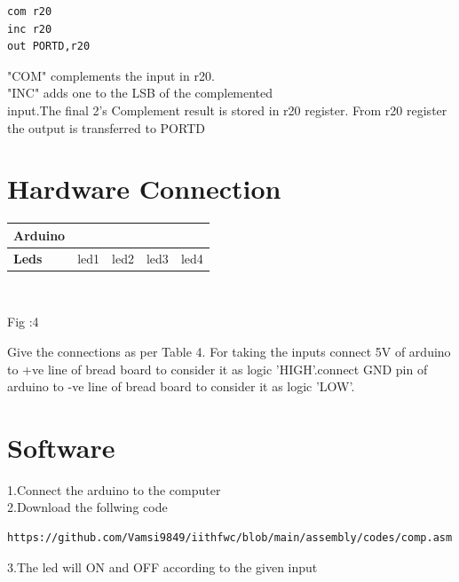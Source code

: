 \documentclass[10pt, a4paper]{article}
\begin{document}
 \begin{lstlisting}
com r20
inc r20
out PORTD,r20
 \end{lstlisting}
"COM" complements the input in r20.\\
"INC" adds one to the LSB of the complemented\\  
    input.The final 2's Complement result is stored in r20 register. From r20 register the output is transferred to PORTD       
 


     
    \section{Hardware Connection}


    
     \begin{tabularx}{0.4\textwidth} {  
  | >{\centering\arraybackslash}X
  | >{\centering\arraybackslash}X 
  | >{\centering\arraybackslash}X 
  | >{\centering\arraybackslash}X  
  | >{\centering\arraybackslash}X |}
  \hline
\textbf{Arduino} &  2  &  3  &  4  &  5\\
\hline
\textbf{Leds}    & led1 & led2 & led3 & led4\\
\hline
 \end{tabularx}\\

 \begin{center}
 Fig :4
   \end{center}




   Give the connections as per Table 4. For taking the inputs connect 5V of arduino to +ve line of bread board to consider it as logic 'HIGH'.connect GND pin of arduino to -ve line of bread board to consider it as logic 'LOW'.


    
    
 
 


  
  \section{Software}
  1.Connect the arduino to the computer
  \\2.Download the follwing code
  
  \begin{lstlisting}
https://github.com/Vamsi9849/iithfwc/blob/main/assembly/codes/comp.asm
  \end{lstlisting}
  3.The led will ON and OFF according to the given input 




    

    
 
\end{document}
